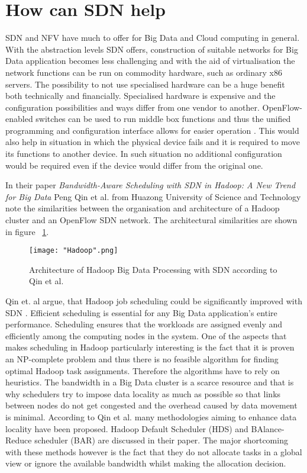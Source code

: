 \documentclass{acm_proc_article-sp}
\begin{document}
\section{How can SDN help}


SDN and NFV have much to offer for Big Data and Cloud computing in general. With the abstraction levels SDN offers, construction of suitable networks for Big Data application becomes less challenging and with the aid of virtualisation the network functions can be run on commodity hardware, such as ordinary x86 servers. The possibility to not use specialised hardware can be a huge benefit both technically and financially. Specialised hardware is expensive and the configuration possibilities and ways differ from one vendor to another. OpenFlow-enabled switches can be used to run middle box functions and thus the unified programming and configuration interface allows for easier operation . This would also help in situation in which the physical device fails and it is required to move its functions to another device. In such situation no additional configuration would be required even if the device would differ from the original one. 

In their paper \textit{Bandwidth-Aware Scheduling with SDN in Hadoop: A New Trend for Big Data} \cite{Scheduling} Peng Qin et al. from Huazong University of Science and Technology note the similarities between the organisation and architecture of a Hadoop cluster and an OpenFlow SDN network. The architectural similarities are shown in figure ~\ref{fig:hadoop}.

\begin{figure}[ht!]
\centering
{}
\texttt{[image: "Hadoop".png]}
\caption{Architecture of Hadoop Big Data Processing with SDN according to Qin et al. \cite{Scheduling}}
\label{fig:hadoop}
\end{figure} 

Qin et. al argue, that Hadoop job scheduling could be significantly improved with SDN \cite{Scheduling}. Efficient scheduling is essential for any Big Data application's entire performance. Scheduling ensures that the workloads are assigned evenly and efficiently among the computing nodes in the system. One of the aspects that makes scheduling in Hadoop particularly interesting is the fact that it is proven an NP-complete problem \cite{Fischer:2010:ATE:1810479.1810484} and thus there is no feasible algorithm for finding optimal Hadoop task assignments. Therefore the algorithms have to rely on heuristics. The bandwidth in a Big Data cluster is a scarce resource and that is why schedulers try to impose data locality as much as possible so that links between nodes do not get congested and the overhead caused by data movement is minimal. According to Qin et al. many methodologies aiming to enhance data locality have been proposed. Hadoop Default Scheduler (HDS) and BAlance-Reduce scheduler (BAR) are discussed in their paper. The major shortcoming with these methods however is the fact that they do not allocate tasks in a global view or ignore the available bandwidth whilst making the allocation decision.
\end{document}

